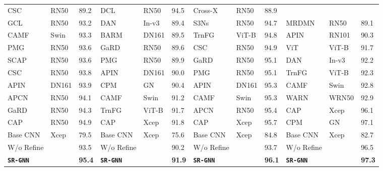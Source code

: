 \documentclass[journal]{IEEEtran}
\begin{document}
\begin{table*}[t]
\begin{small}
\begin{tabular}{|p{1.7 cm} p{8 mm} p{5 mm}|p{1.7 cm} p{8 mm} p{5 mm}|p{1.8 cm} p{8 mm} p{5 mm}|p{1.9 cm} p{13 mm} p{5 mm}|}
CSC \cite{wang2020category} & RN50 & 89.2   & DCL \cite{chen2019destruction} & RN50 & 94.5 &
Cross-X \cite{luo2019cross}  & RN50 & 88.9    \\
GCL \cite{wang2020graph} & RN50 & 93.2 & 
DAN \cite{hu2019see} & In-v3 & 89.4 & S3Ns \cite{ding2019selective} & RN50 & 94.7 & MRDMN \cite{xu2021multiresolution}  & RN50 & 89.1   \\
CAMF{\color{orange}} \cite{miao2021complemental} & Swin & 93.3 & BARM \cite{liu2019bidirectional}& DN161 & 89.5 &
TrnFG{\color{orange}}\cite{he2021transfg} & ViT-B & 94.8 & APIN \cite{zhuang2020learning} & RN101  &90.3  \\
PMG \cite{chang2021your} & RN50 & 93.6 &  
GaRD\cite{zhao2021graph} & RN50 & 89.6 &  
CSC \cite{wang2020category} & RN50& 94.9 &  
ViT{\color{orange}} \cite{dosovitskiy2020image} & ViT-B &	91.7 \\ 
SCAP \cite{liu2021learning} & RN50 & 93.6 &  
PMG \cite {chang2021your} & RN50 & 89.9 & 
GaRD\cite{zhao2021graph} & RN50 & 95.1 &
DAN \cite {hu2019see} & In-v3 &92.2    \\
CSC\cite{wang2020category} & RN50 & 93.8 & 
APIN \cite{zhuang2020learning} &DN161 & 90.0  & PMG \cite{chang2021your} &RN50 & 95.1  & 
TrnFG{\color{orange}}\cite{he2021transfg} & ViT-B &92.3 \\ 
APIN \cite{zhuang2020learning}  &DN161 & 93.9  &
CPM \cite{ge2019weakly} & GN  & 90.4 & 
APIN\cite{zhuang2020learning} & DN161 & 95.3 & 
CAMF{\color{orange}} \cite{miao2021complemental} & Swin & 92.8  \\ 
APCN \cite{ding2021ap} & RN50 & 94.1  & CAMF{\color{orange}} \cite{miao2021complemental} & Swin &  91.2  & CAMF{\color{orange}} \cite{miao2021complemental} & Swin & 95.3 & WARN \cite{lopez2020pay} & WRN50 &92.9   \\
GaRD\cite{zhao2021graph} & RN50 & 94.3 & TrnFG{\color{orange}}\cite{he2021transfg} & ViT-B & 91.7 & APCN \cite{ding2021ap}  &RN50 & 95.4   & 
CAP \cite{behera2021context} & Xcep & 96.1 \\
 CAP \cite{behera2021context} & RN50 & 94.9 & CAP \cite{behera2021context} & Xcep & 91.8  &  CAP \cite{behera2021context} & Xcep & 95.7  &  CPM \cite{ge2019weakly} & GN & 97.1  \\
    \hline
    Base CNN & Xcep & 79.5   & Base CNN & Xcep &75.6  & Base CNN & Xcep &84.8 & Base CNN  & Xcep  & 82.7  \\
    W/o Refine &  & 93.5   &W/o Refine &   &90.2 &W/o Refine & &93.7  &W/o Refine &  &96.5 \\
    \textbf{\texttt{SR-GNN}} &  & \textbf{95.4} &\textbf{\texttt{SR-GNN}} &  & \textbf{91.9} &\textbf{\texttt{SR-GNN}} &  & \textbf{96.1} & \textbf{\texttt{SR-GNN}} &  & \textbf{97.3}   \\

\end{tabular}
\end{small}
\end{table*}
\end{document}
